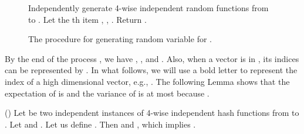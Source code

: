 \def\draft{0}  \documentclass[proceedings]{stacs}
\theoremstyle{plain}\newtheorem{satz}[thm]{Satz}
\theoremstyle{definition}\newtheorem{crucial}[thm]{Crucial Definition}
\begin{document}
\begin{figure}[htp]
\begin{codebox}
\Procname{}
\li Independently generate 4-wise independent random functions  from  to .
\li \For  \To 
\li \Do Let the th item 
\li , , .
\End
\li Return .
\end{codebox}
\caption{ The procedure for generating random variable  for .}
\label{fig:algx}
\end{figure}

\noindent
By the end of the process , we have 
,
, and . Also, when a vector is in , its indices can be represented by . In what follows, we will use a bold letter to represent the index of a high dimensional vector, e.g., .
The following Lemma shows that the expectation of  is  and the variance of  is at most  because .

\begin{lemma}\label{lem:varx}(\cite{IM08}) Let  be two independent instances of 4-wise independent hash functions from  to . Let  and . Let us define . Then
 and , which implies .
\end{lemma}
\end{document}
